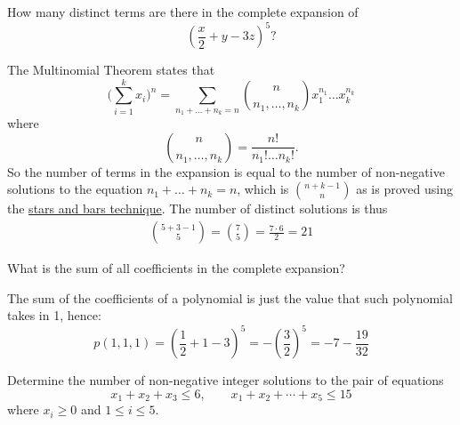 \documentclass[a4paper, english, 12pt]{article} %
\begin{document}
\titlebox


\begin{problem}[16]
  \begin{subproblem}[2]
    How many distinct terms are there in the complete expansion of
    \begin{equation*}
      \left( \frac{x}{2} + y - 3z \right)^5 ?
    \end{equation*}
  \end{subproblem}
\end{problem}

\begin{answer}
  The Multinomial Theorem states that
  \begin{equation*}
    \biggl( \sum_{i=1}^k x_i\biggr)^n = \sum_{n_1 + \dots + n_k = n} \binom{n}{n_1, \dots, n_k}x_1^{n_1}\dots x_k^{n_k}
  \end{equation*}
  where
  \begin{equation*}
    \binom{n}{n_1, \dots, n_k} = \frac{n!}{n_1!\dots n_k!}.
  \end{equation*}
  So the number of terms in the expansion is equal to the number of non-negative
  solutions to the equation $n_1 + \dots + n_k = n$, which is
  $\binom{n+k-1}{n}$ as is proved using the
  \href{http://en.wikipedia.org/wiki/Stars_and_bars_(combinatorics)}{stars and
    bars technique}. The number of distinct solutions is thus
  \begin{align*}
    \binom{5 + 3 - 1}{5} = \binom{7}{5} = \frac{7 \cdot 6}{2} = 21
  \end{align*}
\end{answer}

\begin{subproblem}
  What is the sum of all coefficients in the complete expansion?
\end{subproblem}

\begin{answer}
  The sum of the coefficients of a polynomial is just the value that such
  polynomial takes in 1, hence:
  \begin{equation*}
    p(1,1,1) = \left( \frac{1}{2} + 1 - 3 \right)^5 =- \left( \frac{3}{2} \right)^5
    = - 7 - \frac{19}{32}
  \end{equation*}
\end{answer}

\begin{problem}[18]
  \begin{subproblem}[2]
    Determine the number of non-negative integer solutions to the pair of
    equations
    \begin{equation*}
      x_1 + x_2 + x_3 \leq 6, \qquad x_1 + x_2 + \cdots + x_5 \leq 15
    \end{equation*}
    where $x_i \geq 0$ and $1 \leq i \leq 5$. 
  \end{subproblem}
\end{problem}
\end{document}
